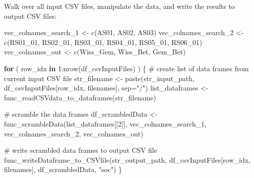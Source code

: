 \documentclass[
]{article}
\newenvironment{Shaded}{\begin{snugshade}}{\end{snugshade}}
\newcommand{\AttributeTok}[1]{\textcolor[rgb]{0.00,0.34,0.68}{#1}}
\newcommand{\CommentTok}[1]{\textcolor[rgb]{0.54,0.53,0.53}{#1}}
\newcommand{\ControlFlowTok}[1]{\textcolor[rgb]{0.12,0.11,0.11}{\textbf{#1}}}
\newcommand{\DecValTok}[1]{\textcolor[rgb]{0.69,0.50,0.00}{#1}}
\newcommand{\FunctionTok}[1]{\textcolor[rgb]{0.39,0.29,0.61}{#1}}
\newcommand{\NormalTok}[1]{\textcolor[rgb]{0.12,0.11,0.11}{#1}}
\newcommand{\OtherTok}[1]{\textcolor[rgb]{0.00,0.43,0.16}{#1}}
\newcommand{\SpecialCharTok}[1]{\textcolor[rgb]{0.24,0.68,0.91}{#1}}
\newcommand{\StringTok}[1]{\textcolor[rgb]{0.75,0.01,0.01}{#1}}
\begin{document}
Walk over all input CSV files, manipulate the data, and write the
results to output CSV files:

\begin{Shaded}
\begin{Highlighting}[]
\NormalTok{vec\_colnames\_search\_1 }\OtherTok{\textless{}{-}} \FunctionTok{c}\NormalTok{(}\StringTok{\textquotesingle{}AS01\textquotesingle{}}\NormalTok{, }\StringTok{\textquotesingle{}AS02\textquotesingle{}}\NormalTok{, }\StringTok{\textquotesingle{}AS03\textquotesingle{}}\NormalTok{)}
\NormalTok{vec\_colnames\_search\_2 }\OtherTok{\textless{}{-}} \FunctionTok{c}\NormalTok{(}\StringTok{\textquotesingle{}RS01\_01\textquotesingle{}}\NormalTok{, }\StringTok{\textquotesingle{}RS02\_01\textquotesingle{}}\NormalTok{, }\StringTok{\textquotesingle{}RS03\_01\textquotesingle{}}\NormalTok{, }\StringTok{\textquotesingle{}RS04\_01\textquotesingle{}}\NormalTok{, }\StringTok{\textquotesingle{}RS05\_01\textquotesingle{}}\NormalTok{, }\StringTok{\textquotesingle{}RS06\_01\textquotesingle{}}\NormalTok{)}
\NormalTok{vec\_colnames\_out }\OtherTok{\textless{}{-}} \FunctionTok{c}\NormalTok{(}\StringTok{\textquotesingle{}Wiss\_Gem\textquotesingle{}}\NormalTok{, }\StringTok{\textquotesingle{}Wiss\_Bet\textquotesingle{}}\NormalTok{, }\StringTok{\textquotesingle{}Gem\_Bet\textquotesingle{}}\NormalTok{)}

\ControlFlowTok{for}\NormalTok{ ( row\_idx }\ControlFlowTok{in} \DecValTok{1}\SpecialCharTok{:}\FunctionTok{nrow}\NormalTok{(df\_csvInputFiles) ) \{}
  \CommentTok{\# create list of data frames from current input CSV file}
\NormalTok{  str\_filename }\OtherTok{\textless{}{-}} \FunctionTok{paste}\NormalTok{(str\_input\_path, df\_csvInputFiles[row\_idx, filenames], }\AttributeTok{sep=}\StringTok{"/"}\NormalTok{)}
\NormalTok{  list\_dataframes }\OtherTok{\textless{}{-}} \FunctionTok{func\_readCSVdata\_to\_dataframes}\NormalTok{(str\_filename)}
  
  \CommentTok{\# scramble the data frames}
\NormalTok{  df\_scrambledData }\OtherTok{\textless{}{-}} \FunctionTok{func\_scrambleData}\NormalTok{(list\_dataframes[[}\DecValTok{2}\NormalTok{]], vec\_colnames\_search\_1, vec\_colnames\_search\_2, vec\_colnames\_out)}
  
  \CommentTok{\# write scrambled data frames to output CSV file}
  \FunctionTok{func\_writeDataframe\_to\_CSVfile}\NormalTok{(str\_output\_path, df\_csvInputFiles[row\_idx, filenames], df\_scrambledData, }\StringTok{"soc"}\NormalTok{)}
\NormalTok{\}}
\end{Highlighting}
\end{Shaded}
\end{document}
